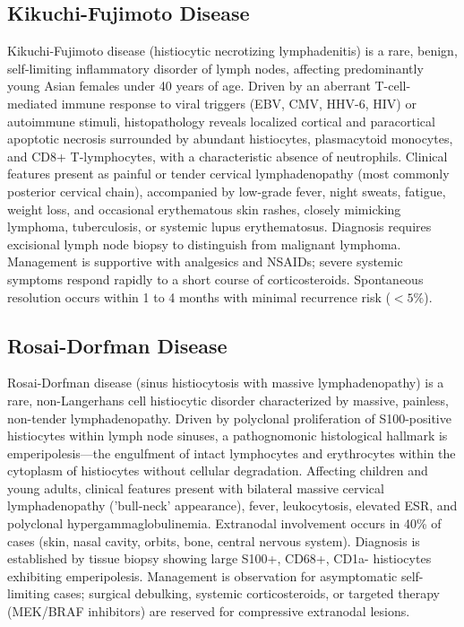\subsection{Kikuchi-Fujimoto Disease}
\label{sec:Kikuchi-Fujimoto Disease}
Kikuchi-Fujimoto disease (histiocytic necrotizing lymphadenitis) is a rare, benign, self-limiting inflammatory disorder of lymph nodes, affecting predominantly young Asian females under 40 years of age. Driven by an aberrant T-cell-mediated immune response to viral triggers (EBV, CMV, HHV-6, HIV) or autoimmune stimuli, histopathology reveals localized cortical and paracortical apoptotic necrosis surrounded by abundant histiocytes, plasmacytoid monocytes, and CD8+ T-lymphocytes, with a characteristic absence of neutrophils. Clinical features present as painful or tender cervical lymphadenopathy (most commonly posterior cervical chain), accompanied by low-grade fever, night sweats, fatigue, weight loss, and occasional erythematous skin rashes, closely mimicking lymphoma, tuberculosis, or systemic lupus erythematosus. Diagnosis requires excisional lymph node biopsy to distinguish from malignant lymphoma. Management is supportive with analgesics and NSAIDs; severe systemic symptoms respond rapidly to a short course of corticosteroids. Spontaneous resolution occurs within 1 to 4 months with minimal recurrence risk ($<5\%$).

\subsection{Rosai-Dorfman Disease}
\label{sec:Rosai-Dorfman Disease}
Rosai-Dorfman disease (sinus histiocytosis with massive lymphadenopathy) is a rare, non-Langerhans cell histiocytic disorder characterized by massive, painless, non-tender lymphadenopathy. Driven by polyclonal proliferation of S100-positive histiocytes within lymph node sinuses, a pathognomonic histological hallmark is emperipolesis---the engulfment of intact lymphocytes and erythrocytes within the cytoplasm of histiocytes without cellular degradation. Affecting children and young adults, clinical features present with bilateral massive cervical lymphadenopathy ('bull-neck' appearance), fever, leukocytosis, elevated ESR, and polyclonal hypergammaglobulinemia. Extranodal involvement occurs in 40\% of cases (skin, nasal cavity, orbits, bone, central nervous system). Diagnosis is established by tissue biopsy showing large S100+, CD68+, CD1a- histiocytes exhibiting emperipolesis. Management is observation for asymptomatic self-limiting cases; surgical debulking, systemic corticosteroids, or targeted therapy (MEK/BRAF inhibitors) are reserved for compressive extranodal lesions.

